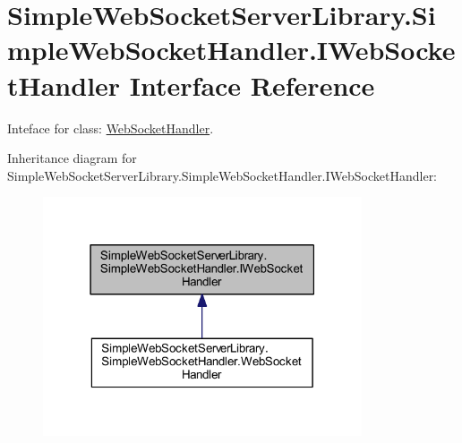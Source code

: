\hypertarget{interface_simple_web_socket_server_library_1_1_simple_web_socket_handler_1_1_i_web_socket_handler}{}\section{Simple\+Web\+Socket\+Server\+Library.\+Simple\+Web\+Socket\+Handler.\+I\+Web\+Socket\+Handler Interface Reference}
\label{interface_simple_web_socket_server_library_1_1_simple_web_socket_handler_1_1_i_web_socket_handler}


Inteface for class\+: \mbox{\hyperlink{class_simple_web_socket_server_library_1_1_simple_web_socket_handler_1_1_web_socket_handler}{Web\+Socket\+Handler}}.  




Inheritance diagram for Simple\+Web\+Socket\+Server\+Library.\+Simple\+Web\+Socket\+Handler.\+I\+Web\+Socket\+Handler\+:
\nopagebreak
\begin{figure}[H]
\begin{center}
\leavevmode
\includegraphics[width=267pt]{interface_simple_web_socket_server_library_1_1_simple_web_socket_handler_1_1_i_web_socket_handler__inherit__graph}
\end{center}
\end{figure}
